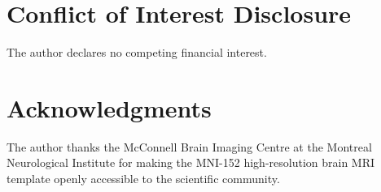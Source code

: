 \documentclass[journal=dme,manuscript=article,11pt]{article}
\begin{document}
\section*{Conflict of Interest Disclosure}
The author declares no competing financial interest.

\section*{Acknowledgments}
The author thanks the McConnell Brain Imaging Centre at the Montreal Neurological Institute for making the MNI-152 high-resolution brain MRI template openly accessible to the scientific community.



\end{document}

